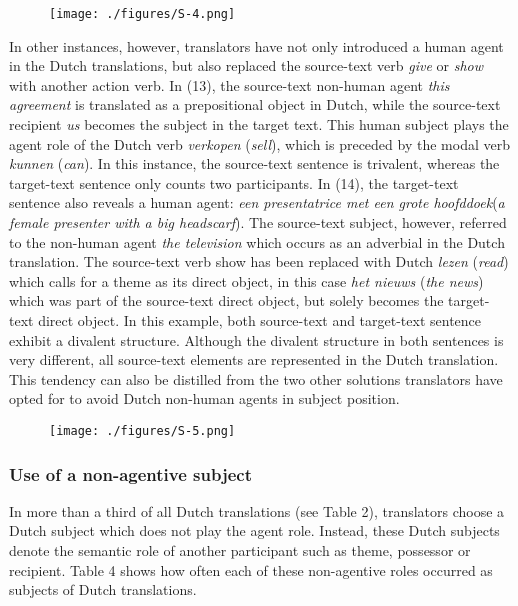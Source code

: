 \documentclass[output=paper]{LSP/langsci}
\begin{document}
\begin{figure}
\texttt{[image: ./figures/S-4.png]}
\end{figure}

In other instances, however, translators have not only introduced a human agent in the Dutch translations, but also replaced the source-text verb \textit{give} or \textit{show} with another action verb. In (13), the source-text non-human agent \textit{this agreement} is translated as a prepositional object in Dutch, while the source-text recipient \textit{us} becomes the subject in the target text. This human subject plays the agent role of the Dutch verb \textit{verkopen} (\textit{sell}), which is preceded by the modal verb \textit{kunnen} (\textit{can}). In this instance, the source-text sentence is trivalent, whereas the target-text sentence only counts two participants. 
In (14), the target-text sentence also reveals a human agent: \textit{een presentatrice met een grote hoofddoek}(\textit{a female presenter with a big headscarf}). The source-text subject, however, referred to the non-human agent \textit{the television} which occurs as an adverbial in the Dutch translation. The source-text verb show has been replaced with Dutch \textit{lezen} (\textit{read}) which calls for a theme as its direct object, in this case \textit{het nieuws} (\textit{the news}) which was part of the source-text direct object, but solely becomes the target-text direct object. In this example, both source-text and target-text sentence exhibit a divalent structure. Although the divalent structure in both sentences is very different, all source-text elements are represented in the Dutch translation. This tendency can also be distilled from the two other solutions translators have opted for to avoid Dutch non-human agents in subject position.             

\begin{figure}
\texttt{[image: ./figures/S-5.png]}
\end{figure}


\subsubsection{Use of a non-agentive subject}

In more than a third of all Dutch translations (see Table 2), translators choose a Dutch subject which does not play the agent role. Instead, these Dutch subjects denote the semantic role of another participant such as theme, possessor or recipient. Table 4 shows how often each of these non-agentive roles occurred as subjects of Dutch translations.
\end{document}
